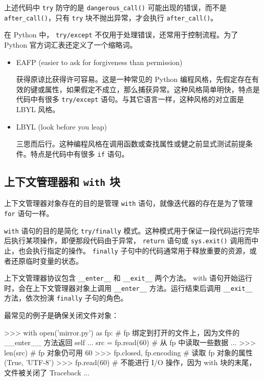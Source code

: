 上述代码中 \texttt{try} 防守的是 \texttt{dangerous\_call()} 可能出现的错误，而不是 \texttt{after\_call()}，只有 \texttt{try} 块不抛出异常，才会执行 \texttt{after\_call()}。

在 Python 中， \texttt{try/except} 不仅用于处理错误，还常用于控制流程。为了 Python 官方词汇表还定义了一个缩略词。

\begin{itemize}
    \item EAFP (easier to ask for forgiveness than permission)
    
    获得原谅比获得许可容易。这是一种常见的 Python 编程风格，先假定存在有效的键或属性，如果假定不成立，那么捕获异常。这种风格简单明快，特点是代码中有很多 \texttt{try/except} 语句。与其它语言一样，这种风格的对立面是 LBYL 风格。

    \item LBYL (look before you leap)
    
    三思而后行。这种编程风格在调用函数或查找属性或健之前显式测试前提条件。特点是代码中有很多 \texttt{if} 语句。
\end{itemize}

\subsection{上下文管理器和 \texttt{with} 块}

上下文管理器对象存在的目的是管理 \texttt{with} 语句，就像迭代器的存在是为了管理 \texttt{for} 语句一样。

\texttt{with} 语句的目的是简化 \texttt{try/finally} 模式。这种模式用于保证一段代码运行完毕后执行某项操作，即便那段代码由于异常， \texttt{return} 语句或 \texttt{sys.exit()} 调用而中止，也会执行指定的操作。 \texttt{finally} 子句中的代码通常用于释放重要的资源，或者还原临时变量的状态。

上下文管理器协议包含 \texttt{\_\_enter\_\_} 和 \texttt{\_\_exit\_\_} 两个方法。 with 语句开始运行时，会在上下文管理器对象上调用 \texttt{\_\_enter\_\_} 方法。运行结束后调用 \texttt{\_\_exit\_\_} 方法，依次扮演 \texttt{finally} 子句的角色。

最常见的例子是确保关闭文件对象：

\begin{python}
>>> with open('mirror.py') as fp:   # fp 绑定到打开的文件上，因为文件的 __enter__ 方法返回 self
...     src = fp.read(60)   # 从 fp 中读取一些数据
... 
>>> len(src)    # fp 对象仍可用
60
>>> fp.closed, fp.encoding  # 读取 fp 对象的属性
(True, 'UTF-8')
>>> fp.read(60)     # 不能进行 I/O 操作，因为 with 块的末尾，文件被关闭了
Traceback ...
\end{python}

